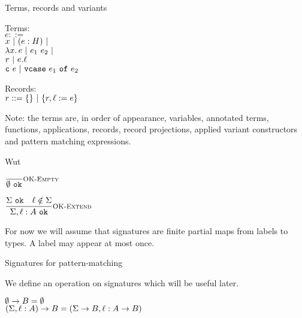 \documentclass{beamer}
\begin{document}
\begin{frame}{Terms, records and variants}

Terms: \\
$e ::=$ \\
\qquad $x \pipe \annot{e}{H} \pipe$ \\
\qquad $\fun{x}{e} \pipe \app{e_1}{e_2} \pipe$ \\
\qquad $r \pipe \proj{e}{\ell}$ \\
\qquad $\cons{\texttt{c}}{e} \pipe \vcase{e_1}{e_2}$

\vspace{2em}

Records: \\
$r ::= \emptyrecord \pipe \extendrecord{r}{\ell}{e}$ \\

\vspace{2em}

Note: the terms are, in order of appearance, variables, annotated terms, functions, applications, records, record projections, applied variant constructors and pattern matching expressions.

\end{frame}

\begin{frame}{Wut}

\begin{center}
  $\infrule[OK-Empty]{}{\sigok{\emptysig}}$

  \vspace{2em}

  $\infrule[OK-Extend]{\sigok{\Sigma} \quad \sidecond{\ell \notin \Sigma}}{\sigok{\extendsig{\Sigma}{\ell}{A}}}$
\end{center}

For now we will assume that signatures are finite partial maps from labels to types. A label may appear at most once.

\end{frame}

\begin{frame}{Signatures for pattern-matching}

We define an operation on signatures which will be useful later.

$\funsig{\emptysig}{B} = \emptysig$ \\
$\funsig{(\extendsig{\Sigma}{\ell}{A})}{B} = (\extendsig{\funsig{\Sigma}{B}}{\ell}{\Fun{A}{B}})$

\end{frame}
\end{document}
